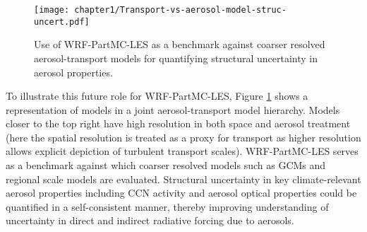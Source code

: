 \begin{figure}[!t]
	\centering
	\texttt{[image: chapter1/Transport-vs-aerosol-model-struc-uncert.pdf]}
	\caption{Use of WRF-PartMC-LES as a benchmark against coarser resolved aerosol-transport models for quantifying structural uncertainty in aerosol properties.}
	\label{fig:transport-vs-aerosol-model}
\end{figure} 

To illustrate this future role for WRF-PartMC-LES, Figure \ref{fig:transport-vs-aerosol-model} shows a representation of models in a joint aerosol-transport model hierarchy. Models closer to the top right have high resolution in both space and aerosol treatment (here the spatial resolution is treated as a proxy for transport as higher resolution allows explicit depiction of turbulent transport scales). WRF-PartMC-LES serves as a benchmark against which coarser resolved models such as GCMs and regional scale models are evaluated. Structural uncertainty in key climate-relevant aerosol properties including CCN activity and aerosol optical properties could be quantified in a self-consistent manner, thereby improving understanding of uncertainty in direct and indirect radiative forcing due to aerosols.   


